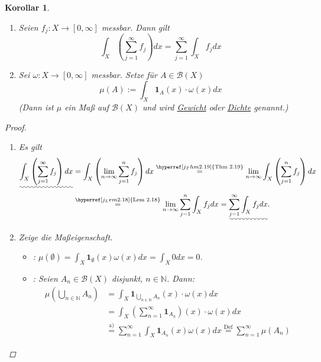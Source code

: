 \documentclass[a4paper]{report}
\newcommand{\doubleOne}{\textbf{1}}
\newcommand{\N}{\mathbb{N}}
\newcommand{\Borel}{\mathcal{B}}
\newcommand{\toInf}{\rightarrow \infty}
\newcommand{\limToInf}[1]{\lim_{#1 \toInf}}
\newcommand{\jlabel}[1]{\label{j_#1}}
\newcommand{\jshortlink}[1]{\jhyperref{#1}{\text{#1}}}
\newcommand{\jhyperref}[2]{\hyperref[j_#1]{#2}}
\newcommand{\jabb}[3]{ #1: #2 \rightarrow #3 }
\theoremstyle{plain}
\newtheorem{kor}[thm]{Korollar}
\theoremstyle{definition}
\begin{document}
{{{\jlabel{Kor 2.20}
\begin{kor}
    \begin{enumerate}
        \item
            Seien $\jabb{f_j}{X}{[0,\infty]}$ messbar. Dann gilt
            \begin{displaymath}
                \int_X \left( \sum_{j=1}^\infty f_j \right) dx = \sum_{j=1}^\infty \int_X f_j dx
            \end{displaymath}
        \item
            Sei $\jabb{\omega}{X}{[0,\infty]}$ messbar. Setze für $A\in\Borel(X)$
            \begin{displaymath}
                \mu(A) := \int_X \doubleOne_{A}(x)\cdot \omega(x) dx
            \end{displaymath}
            (Dann ist $\mu$ ein Maß auf $\Borel(X)$ und wird \uline{Gewicht} oder \uline{Dichte} genannt.)
    \end{enumerate}
    \begin{proof}
        \begin{enumerate}
            \item Es gilt
                \begin{displaymath}
                    \begin{split}
                        \uwave{\int_X \left( \sum_{j=1}^\infty f_j \right) dx} &= \int_X\left( \limToInf{n} \sum_{j=1}^n f_j \right) dx \overset{\jshortlink{Thm 2.19}}{=} \limToInf{n} \int_X \left( \sum_{j=1}^n f_j \right)dx\\
                        &\overset{\jshortlink{Lem 2.18}}{=} \limToInf{n} \sum_{j=1}^n \int_X f_j dx = \uwave{\sum_{j=1}^\infty \int_X f_j dx}.
                    \end{split}
                \end{displaymath}
            \item Zeige die Maßeigenschaft.
                \begin{itemize}
                    \item[(M1)]: $\mu(\emptyset) = \int_X \doubleOne_\emptyset(x) \omega(x) dx = \int_X 0 dx = 0$.
                    \item[(M2)]: Seien $A_n \in \Borel(X)$ disjunkt, $n\in\N$. Dann:
                    \begin{displaymath}
                        \begin{split}
                            \mu \left(\bigcup_{n\in\N} A_n \right) &= \int_X \doubleOne_{\bigcup_{n\in\N} A_n}(x)\cdot \omega(x) dx \\
                            &= \int_X \left(\sum_{n=1}^\infty \doubleOne_{A_n}\right)(x) \cdot \omega(x) dx\\
                            &\overset{\text{a)}}{=} \sum_{n=1}^\infty \int_X \doubleOne_{A_n}(x)\omega(x) dx \overset{\text{Def}}{=} \sum_{n=1}^\infty \mu(A_n)
                        \end{split}
                    \end{displaymath}
                \end{itemize}


\end{enumerate}
\end{proof}
\end{kor}}}}
\end{document}

